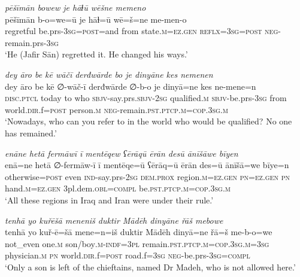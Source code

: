 \ea \label{ŠJ.95}
\textit{pēšīmān bowew je hāɫū wēšne memeno} \\ 
\gll pēšīmān b-o=we=ū je hāɫ=ū wē=š=ne me-men-o \\ 
 regretful be.prs\textsc{-3sg}\textsc{=\textsc{post}}=and from state\textsc{.m}\textsc{=ez.gen} \textsc{reflx}\textsc{=3sg}\textsc{=\textsc{post}} \textsc{neg-}remain.prs\textsc{-3sg} \\ 
\glt `He (Jafir Sān) regretted it. He changed his ways.'
\z 
 
\ea \label{ŠJ.101}
\textit{dey āro be kē wāčī derđwārde bo je dinyāne kes nemenen} \\ 
\gll dey āro be kē ∅-wāč-ī derđwārde ∅-b-o je dinyā=ne kes ne-mene=n \\ 
 \textsc{disc.ptcl} today to who \textsc{sbjv-}say.prs.\textsc{sbjv-}\textsc{2sg} qualified\textsc{.m} \textsc{sbjv-}be.prs\textsc{-3sg} from world\textsc{.dir}.f\textsc{=\textsc{post}} person\textsc{.m} \textsc{neg-}remain\textsc{.pst}\textsc{.ptcp}\textsc{.m}\textsc{=cop}\textsc{.3sg}\textsc{.m} \\ 
\glt `Nowadays, who can you refer to in the world who would be qualified? No one has remained.'
\z 
 
\ea \label{ŠJ.102}
\textit{enāne hetā fermāwī ī mentēqew ʕērāqū ērān desū ānīšāwe bīyen} \\ 
\gll enā=ne hetā ∅-fermāw-ī ī mentēqe=ū ʕērāq=ū ērān des=ū ānīšā=we bīye=n \\ 
 otherwise\textsc{=\textsc{post}} even \textsc{ind-}say.prs-\textsc{2sg} \textsc{dem.prox} region\textsc{.m}\textsc{=ez.gen} \textsc{pn}\textsc{=ez.gen} \textsc{pn} hand\textsc{.m}\textsc{=ez.gen} 3pl.dem\textsc{.obl}\textsc{=compl} be\textsc{.pst}\textsc{.ptcp}\textsc{.m}\textsc{=cop}\textsc{.3sg}\textsc{.m} \\ 
\glt `All these regions in Iraq and Iran were under their rule.'
\z 
 
\ea \label{ŠJ.105}
\textit{tenhā yo kuřēšā meneniš duktir Mādēh dinyāne řāš mebowe} \\ 
\gll tenhā yo kuř-ē=šā mene=n=iš duktir Mādēh dinyā=ne řā=š me-b-o=we \\ 
 not\_even one\textsc{.m} son/boy\textsc{.m}\textsc{-indf}\textsc{=3pl} remain\textsc{.pst}\textsc{.ptcp}\textsc{.m}\textsc{=cop}\textsc{.3sg}\textsc{.m}\textsc{=3sg} physician\textsc{.m} \textsc{pn} world\textsc{.dir}.f\textsc{=\textsc{post}} road.f\textsc{=3sg} \textsc{neg-}be.prs\textsc{-3sg}\textsc{=compl} \\ 
\glt `Only a son is left of the chieftains, named Dr Madeh, who is not allowed here.'
\z 
 
